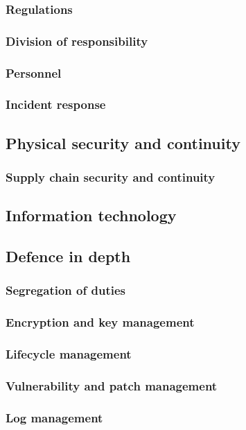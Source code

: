 \documentclass{article}
\begin{document}
\subsubsection{Regulations}
\subsubsection{Division of responsibility}
\subsubsection{Personnel}
\subsubsection{Incident response}

\subsection{Physical security and continuity}
\subsubsection{Supply chain security and continuity}

\subsection{Information technology}
\subsection{Defence in depth}
\subsubsection{Segregation of duties}
\subsubsection{Encryption and key management} %
\subsubsection{Lifecycle management}
\subsubsection{Vulnerability and patch management}
\subsubsection{Log management}
\end{document}
